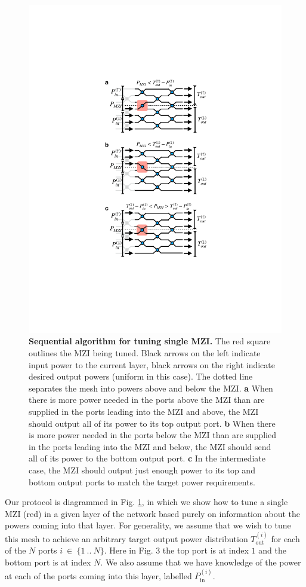 \begin{figure}[htp]
\centering
\includegraphics[width=0.6\columnwidth]{figures/MZI_tune}
\caption{\label{fig:algo} \textbf{Sequential algorithm for tuning single MZI.} The red square outlines the MZI being tuned.  Black arrows on the left indicate input power to the current layer, black arrows on the right indicate desired output powers (uniform in this case).  The dotted line separates the mesh into powers above and below the MZI.  \textbf{a} When there is more power needed in the ports above the MZI than are supplied in the ports leading into the MZI and above, the MZI should output all of its power to its top output port. \textbf{b} When there is more power needed in the ports below the MZI than are supplied in the ports leading into the MZI and below, the MZI should send all of its power to the bottom output port.  \textbf{c} In the intermediate case, the MZI should output just enough power to its top and bottom output ports to match the target power requirements.}
\end{figure}

Our protocol is diagrammed in Fig. \ref{fig:algo}, in which we show how to tune a single MZI (red) in a given layer of the network based purely on information about the powers coming into that layer.  For generality, we assume that we wish to tune this mesh to achieve an arbitrary target output power distribution $T_\textrm{out}^{(i)}$ for each of the $N$ ports $i~\in~\{1~..~N\}$.  Here in Fig. 3 the top port is at index $1$ and the bottom port is at index $N$.  We also assume that we have knowledge of the power at each of the ports coming into this layer, labelled $P_\textrm{in}^{(i)}$.

